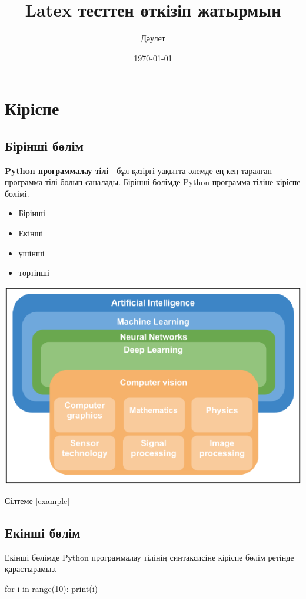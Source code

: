 \documentclass[14pt, a4paper]{book}
\author{Дәулет}
\title{Latex тесттен өткізіп жатырмын}
\date{\today}
\begin{document}
    \maketitle

    \tableofcontents{}
    \clearpage

    \chapter{Кіріспе}
    \section{Бірінші бөлім}
    \textbf{Python программалау тілі} - бұл қәзіргі уақытта әлемде ең кең 
    таралған программа тілі болып саналады. Бірінші бөлімде Python 
    программа тіліне кіріспе бөлімі.

    \begin{itemize}
        \item Бірінші
        \item Екінші
        \item үшінші
        \item төртінші
    \end{itemize}

    \includegraphics[scale=0.6]{images/cv-1.png}

    Сілтеме \ref{example}
    \section{Екінші бөлім}
    Екінші бөлімде Python программалау тілінің синтаксисіне кіріспе
    бөлім ретінде қарастырамыз.

    \label{example}
    for i in range(10):
        print(i)
\end{document}
